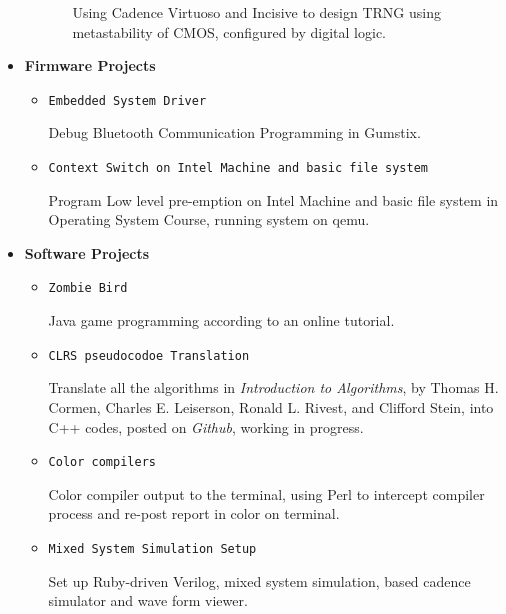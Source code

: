 \documentclass[]{article}
\begin{document}
\begin{itemize}
\begin{itemize}
\begin{itemize}
            Using Cadence Virtuoso and Incisive to design TRNG using metastability of CMOS,
            configured by digital logic.
        \end{itemize}

    \end{itemize}

    \item \textbf{Firmware Projects}

    \begin{itemize}

        \item \verb+Embedded System Driver+

        Debug Bluetooth Communication Programming in Gumstix.

        \item \verb+Context Switch on Intel Machine and basic file system+

        Program Low level pre-emption on Intel Machine and basic file system in Operating System
        Course, running system on qemu.

    \end{itemize}

    \item \textbf{Software Projects}
        
    \begin{itemize} 

        \item \verb+Zombie Bird+

        Java game programming according to an online tutorial.

        \item \verb+CLRS pseudocodoe Translation+

        Translate all the algorithms in \textit{Introduction to Algorithms}, by Thomas H. Cormen,
        Charles E. Leiserson, Ronald L. Rivest, and Clifford Stein, into C++ codes, posted on
        \textit{Github}, working in progress.

        \item \verb+Color compilers+

        Color compiler output to the terminal, using Perl to intercept compiler process and re-post
        report in color on terminal.

        \item \verb+Mixed System Simulation Setup+
        
        Set up Ruby-driven Verilog, mixed system simulation, based cadence simulator and wave form
        viewer.


\end{itemize}
\end{itemize}
\end{document}
